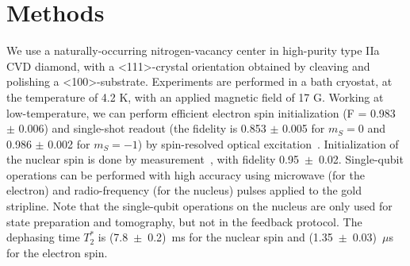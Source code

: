 \newpage
\def\bra#1{\left<#1\right|}
\def\ket#1{\left|#1\right>}
\def\dm#1{\left|#1\right> \left<#1\right|}
\section{Methods}
We use a naturally-occurring nitrogen-vacancy center in high-purity type IIa CVD diamond, with a \textless 111\textgreater-crystal orientation obtained by cleaving and polishing a \textless100\textgreater -substrate. Experiments are performed in a bath cryostat, at the temperature of 4.2 K, with an applied magnetic field of 17 G. Working at low-temperature, we can perform efficient electron spin initialization (F = 0.983 $\pm$ 0.006) and single-shot readout (the fidelity is 0.853 $\pm$ 0.005 for $m_S = 0$ and 0.986 $\pm$ 0.002 for $m_S = -1$) by spin-resolved optical excitation~\cite{Robledo_Nature_2011}. Initialization of the nuclear spin is done by measurement~\cite{Robledo_Nature_2011}, with fidelity  0.95~$\pm$~0.02. Single-qubit operations can be performed with high accuracy using microwave (for the electron) and radio-frequency (for the nucleus) pulses applied to the gold stripline. Note that the single-qubit operations on the nucleus are only used for state preparation and tomography, but not in the feedback protocol. The dephasing time $T_2^*$ is (7.8~$\pm$~0.2)~ms for the nuclear spin and (1.35~$\pm$~0.03)~$\mu$s for the electron spin. 

